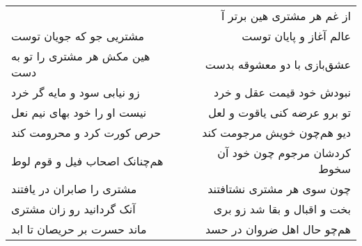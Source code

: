 \begin{center}
\begin{longtable}{l p{0.5cm} r}
&&
از غم هر مشتری هین برتر آ
\\
مشتریی جو که جویان توست
&&
عالم آغاز و پایان توست
\\
هین مکش هر مشتری را تو به دست
&&
عشق‌بازی با دو معشوقه بدست
\\
زو نیابی سود و مایه گر خرد
&&
نبودش خود قیمت عقل و خرد
\\
نیست او را خود بهای نیم نعل
&&
تو برو عرضه کنی یاقوت و لعل
\\
حرص کورت کرد و محرومت کند
&&
دیو هم‌چون خویش مرجومت کند
\\
هم‌چنانک اصحاب فیل و قوم لوط
&&
کردشان مرجوم چون خود آن سخوط
\\
مشتری را صابران در یافتند
&&
چون سوی هر مشتری نشتافتند
\\
آنک گردانید رو زان مشتری
&&
بخت و اقبال و بقا شد زو بری
\\
ماند حسرت بر حریصان تا ابد
&&
هم‌چو حال اهل ضروان در حسد
\\
\end{longtable}
\end{center}
